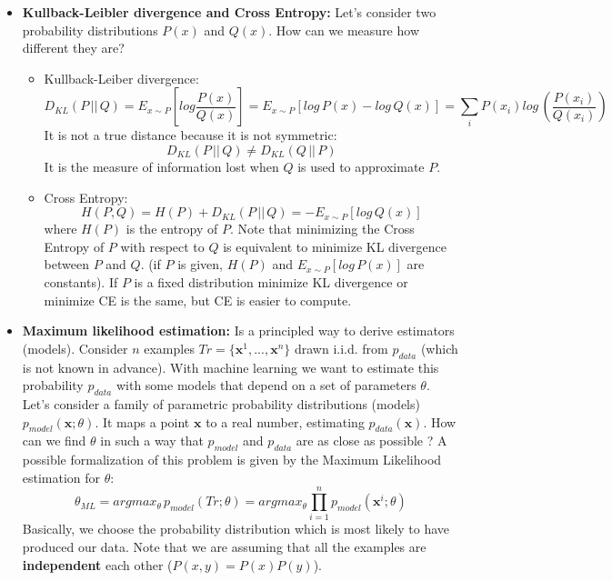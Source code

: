 \begin{itemize}
    \item \textbf{Kullback-Leibler divergence and Cross Entropy:} Let's consider two probability distributions $P(x)$ and $Q(x)$. How can we measure how different they are?
    \begin{itemize}
        \item Kullback-Leiber divergence:
        \[D_{KL}(P \,||\, Q) = E_{x \sim P}\left[ log\frac{P(x)}{Q(x)} \right] = E_{x \sim P}[ log\, P(x) - log\, Q(x)] = \sum_i P(x_i) log\, \left(\frac{P(x_i)}{Q(x_i)}\right)\]
        It is not a true distance because it is not symmetric:
        \[D_{KL}(P \, ||\, Q) \neq D_{KL}(Q \, ||\, P)\]
        It is the measure of information lost when $Q$ is used to approximate $P$.


        \item Cross Entropy:
        \[H(P, Q) = H(P) + D_{KL}(P\, ||\, Q) = -E_{x \sim P}[log\, Q(x)]\]
        where $H(P)$ is the entropy of $P$. Note that minimizing the Cross Entropy of $P$ with respect to $Q$ is equivalent to minimize KL divergence between $P$ and $Q$. (if $P$ is given, $H(P)$ and $E_{x \sim P}[log\, P(x)]$ are constants). If $P$ is a fixed distribution minimize KL divergence or minimize CE is the same, but CE is easier to compute.
    \end{itemize}

    \item \textbf{Maximum likelihood estimation:} Is a principled way to derive estimators (models). Consider $n$ examples $Tr = \{\textbf{x}^{1}, ..., \textbf{x}^{n}\}$ drawn i.i.d. from $p_{data}$ (which is not known in advance). With machine learning we want to estimate this probability $p_{data}$ with some models that depend on a set of parameters $\theta$.\newline\newline
    Let's consider a family of parametric probability distributions (models) $p_{model}(\textbf{x}; \theta)$. It maps a point $\textbf{x}$ to a real number, estimating $p_{data} (\textbf{x})$. How can we find $\theta$ in such a way that $p_{model}$ and $p_{data}$ are as close as possible ? A possible formalization of this problem is given by the Maximum Likelihood estimation for $\theta$:
    \[\theta_{ML} = argmax_{\theta}\, p_{model}(Tr; \theta) = argmax_{\theta}\prod_{i = 1}^{n}p_{model}(\textbf{x}^{i}; \theta)\]
    Basically, we choose the probability distribution which is most likely to have produced our data. Note that we are assuming that all the examples are \textbf{independent} each other ($P(x, y) = P(x)P(y)$).
\end{itemize}

